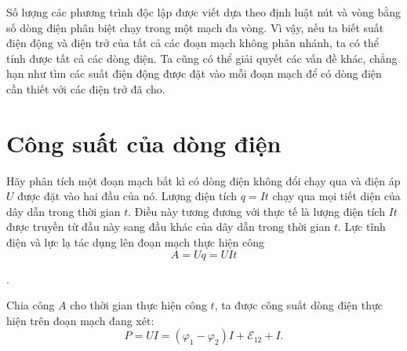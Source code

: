 Số lượng các phương trình độc lập được viết dựa theo định luật nút và vòng bằng số dòng điện phân biệt chạy trong một mạch đa vòng. Vì vậy, nếu ta biết suất điện động và điện trở của tất cả các đoạn mạch không phân nhánh, ta có thể tính được tất cả các dòng điện. Ta cũng có thể giải quyết các vấn đề khác, chẳng hạn như tìm các suất điện động được đặt vào mỗi đoạn mạch để có dòng điện cần thiết với các điện trở đã cho.

\section{Công suất của dòng điện}\label{sec:5_7}

Hãy phân tích một đoạn mạch bất kì có dòng điện không đổi chạy qua và điện áp $U$ được đặt vào hai đầu của nó. Lượng điện tích $q=It$ chạy qua mọi tiết diện của dây dẫn trong thời gian $t$. Điều này tương đương với thực tế là lượng điện tích $It$ được truyền từ đầu này sang đầu khác của dây dẫn trong thời gian $t$. Lực tĩnh điện và lực lạ tác dụng lên đoạn mạch thực hiện công
\begin{equation}\label{eq:5_32}
    A = U q = U I t
\end{equation}

.

Chia công $A$ cho thời gian thực hiện công $t$, ta được công suất dòng điện thực hiện trên đoạn mạch đang xét:
\begin{equation}\label{eq:5_33}
    P = U I = (\varphi_1 - \varphi_2) I + \mathcal{E}_{12} + I.
\end{equation}

